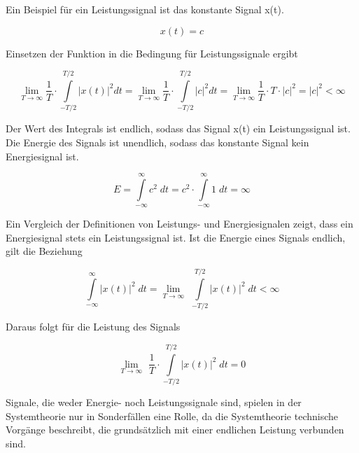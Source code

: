 \noindent Ein Beispiel f\"{u}r ein Leistungssignal ist das konstante Signal x(t).

\begin{equation}\label{eq:oneeleven}
x\left(t\right)=c
\end{equation}

\noindent Einsetzen der Funktion in die Bedingung f\"{u}r Leistungssignale ergibt

\begin{equation}\label{eq:onetwelve}
\lim_{T \to \infty} \dfrac{1}{T}\cdot \int\limits _{-T/2}^{T/2}\left|x(t)\right|^{2} dt 
=\lim_{T \to \infty} \dfrac{1}{T}\cdot \int\limits _{-T/2}^{T/2}\left|c\right|^{2} dt 
=\lim_{T \to \infty} \dfrac{1}{T}\cdot T\cdot \left|c\right|^{2} =\left|c\right|^{2} <\infty
\end{equation}


\noindent Der Wert des Integrals ist endlich, sodass das Signal x(t) ein Leistungssignal ist. Die Energie des Signals ist unendlich, sodass das konstante Signal kein Energiesignal ist.

\begin{equation}\label{eq:onethirteen}
E=\int\limits _{-\infty }^{\infty }c^{2} \;  dt=c^{2} \cdot \int\limits _{-\infty }^{\infty }1 \;  dt=\infty
\end{equation}

\noindent Ein Vergleich der Definitionen von Leistungs- und Energiesignalen zeigt, dass ein Energiesignal stets ein Leistungssignal ist. Ist die Energie eines Signals endlich, gilt die Beziehung

\begin{equation}\label{eq:onefourteen}
\int\limits _{-\infty }^{\infty }\left|x\left(t\right)\right|^{2} \; dt=\lim_{T \to \infty}  \, \, \int\limits _{-T/2}^{T/2}\left|x\left(t\right)\right|^{2} \; dt<\infty
\end{equation}


\noindent Daraus folgt f\"{u}r die Leistung des Signals

\begin{equation}\label{eq:onefifteen}
\lim_{T \to \infty}  \, \, \dfrac{1}{T} \cdot \int\limits _{-T/2}^{T/2}\left|x(t)\right|^{2} \; dt=0
\end{equation}


\noindent Signale, die weder Energie- noch Leistungssignale sind, spielen in der Systemtheorie nur in Sonderf\"{a}llen eine Rolle, da die Systemtheorie technische Vorg\"{a}nge beschreibt, die grunds\"{a}tzlich mit einer endlichen Leistung verbunden sind.


